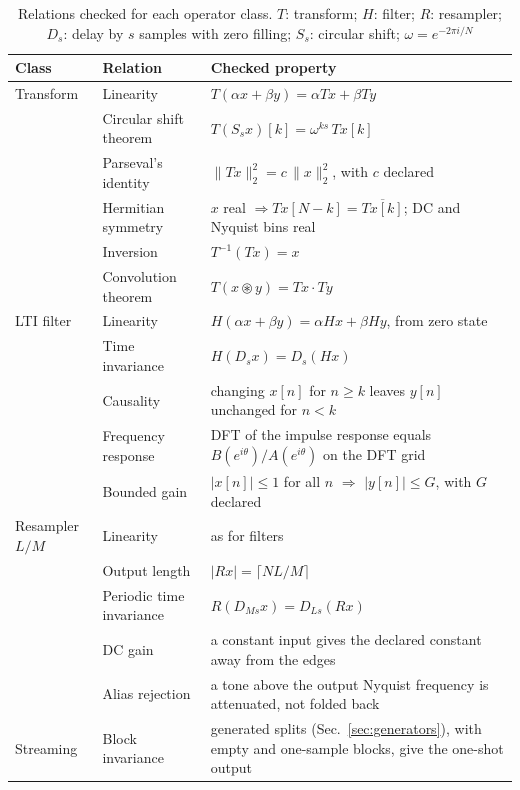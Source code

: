\documentclass[10pt,conference]{IEEEtran}
\begin{document}
\begin{table}[t]
\caption{Relations checked for each operator class. $T$: transform; $H$: filter; $R$: resampler; $D_s$: delay by $s$ samples with zero filling; $S_s$: circular shift; $\omega=e^{-2\pi i/N}$}
\label{tab:relations}
\centering\footnotesize
\renewcommand{\arraystretch}{1.15}
\begin{tabular}{@{}lll@{}}
\toprule
Class & Relation & Checked property \\
\midrule
Transform & Linearity & $T(\alpha x+\beta y)=\alpha Tx+\beta Ty$ \\
 & Circular shift theorem & $T(S_s x)[k]=\omega^{ks}\,Tx[k]$ \\
 & Parseval's identity & $\|Tx\|_2^2=c\,\|x\|_2^2$, with $c$ declared \\
 & Hermitian symmetry & $x$ real $\Rightarrow Tx[N-k]=\overline{Tx[k]}$; DC and Nyquist bins real \\
 & Inversion & $T^{-1}(Tx)=x$ \\
 & Convolution theorem & $T(x\circledast y)=Tx\cdot Ty$ \\
\midrule
LTI filter & Linearity & $H(\alpha x+\beta y)=\alpha Hx+\beta Hy$, from zero state \\
 & Time invariance & $H(D_s x)=D_s(Hx)$ \\
 & Causality & changing $x[n]$ for $n\ge k$ leaves $y[n]$ unchanged for $n<k$ \\
 & Frequency response & DFT of the impulse response equals $B(e^{i\theta})/A(e^{i\theta})$ on the DFT grid \\
 & Bounded gain & $|x[n]|\le1$ for all $n$ $\Rightarrow$ $|y[n]|\le G$, with $G$ declared \\
\midrule
Resampler $L/M$ & Linearity & as for filters \\
 & Output length & $|Rx|=\lceil NL/M\rceil$ \\
 & Periodic time invariance & $R(D_{Ms}x)=D_{Ls}(Rx)$ \\
 & DC gain & a constant input gives the declared constant away from the edges \\
 & Alias rejection & a tone above the output Nyquist frequency is attenuated, not folded back \\
\midrule
Streaming & Block invariance & generated splits (Sec.~\ref{sec:generators}), with empty and one-sample blocks, give the one-shot output \\
\bottomrule
\end{tabular}
\end{table}
\end{document}
